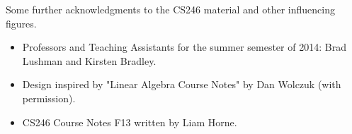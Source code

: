 Some further acknowledgments to the CS246 material and other influencing figures.

\begin{itemize}

\item Professors and Teaching Assistants for the summer semester of 2014: Brad Lushman and Kirsten Bradley.
\item Design inspired by "Linear Algebra Course Notes" by Dan Wolczuk (with permission).
\item CS246 Course Notes F13 written by Liam Horne.

\end{itemize}